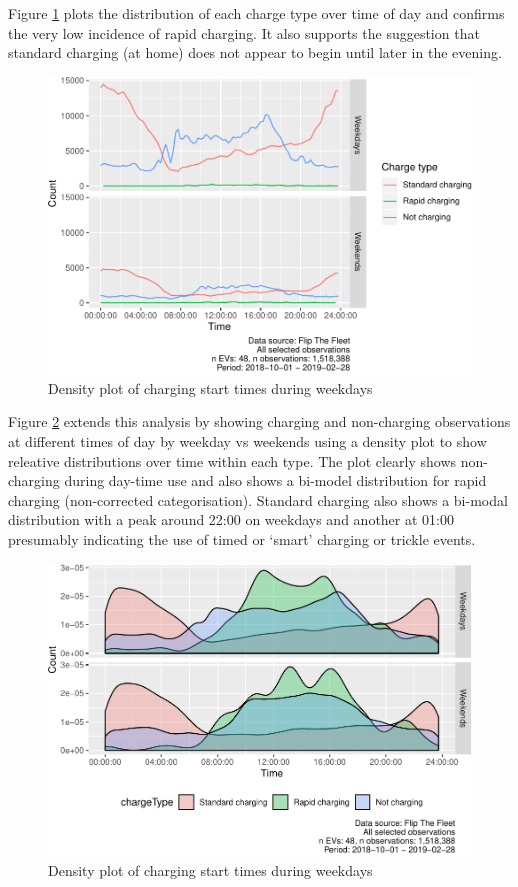 \documentclass[]{article}
\begin{document}
Figure \ref{fig:chargeTimeProp} plots the distribution of each charge type over time of day and confirms the very low incidence of rapid charging. It also supports the suggestion that standard charging (at home) does not appear to begin until later in the evening.

\begin{figure}
\centering
\includegraphics{EVBB_report_v1_files/figure-latex/chargeTimeProp-1.pdf}
\caption{\label{fig:chargeTimeProp}Density plot of charging start times during weekdays}
\end{figure}

Figure \ref{fig:chargeTimeTypes} extends this analysis by showing charging and non-charging observations at different times of day by weekday vs weekends using a density plot to show releative distributions over time within each type. The plot clearly shows non-charging during day-time use and also shows a bi-model distribution for rapid charging (non-corrected categorisation). Standard charging also shows a bi-modal distribution with a peak around 22:00 on weekdays and another at 01:00 presumably indicating the use of timed or `smart' charging or trickle events.

\begin{figure}
\centering
\includegraphics{EVBB_report_v1_files/figure-latex/chargeTimeTypes-1.pdf}
\caption{\label{fig:chargeTimeTypes}Density plot of charging start times during weekdays}
\end{figure}
\end{document}
